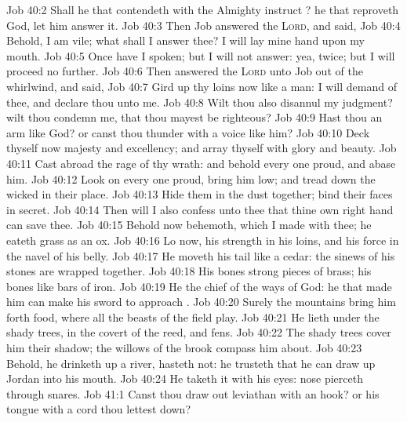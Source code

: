 \vs Job 40:2 Shall he that contendeth with the Almighty instruct ? he that reproveth God, let him answer it.
\vs Job 40:3 Then Job answered the \textsc{Lord}, and said,
\vs Job 40:4 Behold, I am vile; what shall I answer thee? I will lay mine hand upon my mouth.
\vs Job 40:5 Once have I spoken; but I will not answer: yea, twice; but I will proceed no further.
\vs Job 40:6 Then answered the \textsc{Lord} unto Job out of the whirlwind, and said,
\vs Job 40:7 Gird up thy loins now like a man: I will demand of thee, and declare thou unto me.
\vs Job 40:8 Wilt thou also disannul my judgment? wilt thou condemn me, that thou mayest be righteous?
\vs Job 40:9 Hast thou an arm like God? or canst thou thunder with a voice like him?
\vs Job 40:10 Deck thyself now  majesty and excellency; and array thyself with glory and beauty.
\vs Job 40:11 Cast abroad the rage of thy wrath: and behold every one  proud, and abase him.
\vs Job 40:12 Look on every one  proud,  bring him low; and tread down the wicked in their place.
\vs Job 40:13 Hide them in the dust together;  bind their faces in secret.
\vs Job 40:14 Then will I also confess unto thee that thine own right hand can save thee.
\vs Job 40:15 Behold now behemoth, which I made with thee; he eateth grass as an ox.
\vs Job 40:16 Lo now, his strength  in his loins, and his force  in the navel of his belly.
\vs Job 40:17 He moveth his tail like a cedar: the sinews of his stones are wrapped together.
\vs Job 40:18 His bones  strong pieces of brass; his bones  like bars of iron.
\vs Job 40:19 He  the chief of the ways of God: he that made him can make his sword to approach .
\vs Job 40:20 Surely the mountains bring him forth food, where all the beasts of the field play.
\vs Job 40:21 He lieth under the shady trees, in the covert of the reed, and fens.
\vs Job 40:22 The shady trees cover him  their shadow; the willows of the brook compass him about.
\vs Job 40:23 Behold, he drinketh up a river,  hasteth not: he trusteth that he can draw up Jordan into his mouth.
\vs Job 40:24 He taketh it with his eyes:  nose pierceth through snares.
\vs Job 41:1 Canst thou draw out leviathan with an hook? or his tongue with a cord  thou lettest down?
